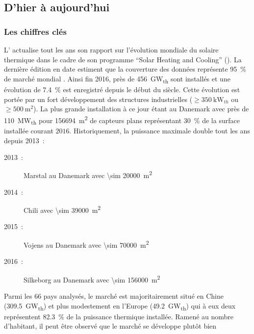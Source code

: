 \subsection{D’hier à aujourd’hui} %
\label{sub:d_hier_a_aujourd_hui}
\subsubsection{Les chiffres clés} %
\label{ssub:les_chiffres_cles}

L’ actualise tout les ans son rapport sur l’évolution mondiale du solaire thermique
dans le cadre de son programme \enquote{Solar Heating and Cooling} (). La dernière
édition en date estiment que la couverture des données représente \SI{95}{\percent} de
marché mondial \parencite{Weiss2017}. Ainsi fin 2016, près de \SI{456}{\giga\watt_{th}}
sont installés et une évolution de \SI{7.4}{\percent} est enregistré depuis le début du
siècle. Cette évolution est portée par un fort développement des structures industrielles
($\geq \SI{350}{\kilo\watt_{th}}$ ou $\geq \SI{500}{\metre\squared}$). La plus grande
installation à ce jour étant au Danemark avec près de \SI{110}{\mega\watt_{th}} pour
\SI{156694}{\metre\squared} de capteurs plans représentant \SI{30}{\percent} de la surface
installée courant $2016$. Historiquement, la puissance maximale double tout les ans depuis
2013~:
\begin{description}
    \item[2013~:] Marstal au Danemark avec \SI{\sim 20000}{\metre\squared}
    \item[2014~:] Chili avec \SI{\sim 39000}{\metre\squared}
    \item[2015~:] Vojens au Danemark avec \SI{\sim 70000}{\metre\squared}
    \item[2016~:] Silkeborg  au Danemark avec \SI{\sim 156000}{\metre\squared}
\end{description}
Parmi les $66$ pays analysés, le marché est majoritairement situé en Chine
(\SI{309.5}{\giga\watt_{th}}) et plus modestement en l’Europe (\SI{49.2}{\giga\watt_{th}})
qui à eux deux représentent \SI{82.3}{\percent} de la puissance thermique installée.
Ramené au nombre d’habitant, il peut être observé que le marché se développe plutôt bien
